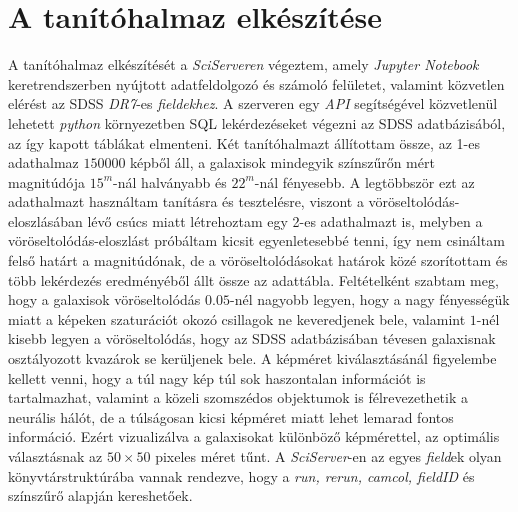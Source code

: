 \documentclass[12pt,letterpaper,oneside,openright]{book}
\begin{document}
 \section{A tanítóhalmaz elkészítése}
 A tanítóhalmaz elkészítését a \textit{SciServeren}\cite{sci} végeztem, amely \textit{Jupyter Notebook} keretrendszerben nyújtott adatfeldolgozó és számoló felületet, valamint közvetlen elérést az SDSS \textit{DR7}-es \textit{fieldekhez}. A szerveren egy \textit{API} segítségével közvetlenül lehetett \textit{python} környezetben SQL lekérdezéseket végezni az SDSS adatbázisából, az így kapott táblákat elmenteni. Két tanítóhalmazt állítottam össze, az 1-es adathalmaz $\num{150000}$ képből áll, a galaxisok mindegyik színszűrőn mért magnitúdója $15^m$-nál halványabb és $22^m$-nál fényesebb. A legtöbbször ezt az adathalmazt használtam tanításra és tesztelésre, viszont a vöröseltolódás-eloszlásában lévő csúcs miatt létrehoztam egy 2-es adathalmazt is, melyben a vöröseltolódás-eloszlást
 próbáltam kicsit egyenletesebbé tenni, így nem csináltam felső határt a magnitúdónak, de a vöröseltolódásokat határok közé szorítottam és több lekérdezés eredményéből állt össze az adattábla.
  \newline \indent
Feltételként szabtam meg, hogy a galaxisok vöröseltolódás $0.05$-nél nagyobb legyen, hogy a nagy fényességük miatt a képeken szaturációt okozó csillagok ne keveredjenek bele, valamint $1$-nél kisebb legyen a vöröseltolódás, hogy az SDSS adatbázisában tévesen galaxisnak osztályozott kvazárok se kerüljenek bele. A képméret kiválasztásánál figyelembe kellett venni, hogy a túl nagy kép túl sok haszontalan információt is tartalmazhat, valamint a közeli szomszédos objektumok is félrevezethetik a neurális hálót, de a túlságosan kicsi képméret miatt lehet lemarad fontos információ. Ezért vizualizálva a galaxisokat különböző képmérettel, az optimális választásnak az $50\times 50$ pixeles méret tűnt.
\newline\indent
 A \textit{SciServer}-en az egyes \textit{field}ek olyan könyvtárstruktúrába vannak rendezve, hogy a \textit{run, rerun, camcol, fieldID} és színszűrő alapján kereshetőek. 
\end{document}

